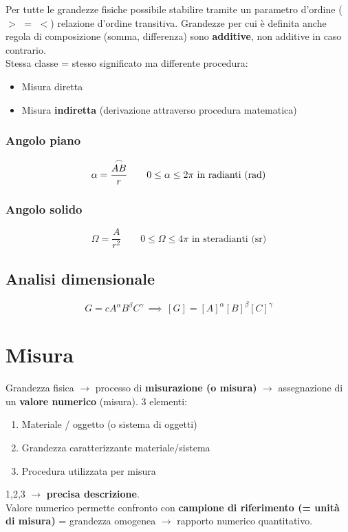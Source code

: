 \documentclass[10pt, oneside]{book}
\begin{document}
Per tutte le grandezze fisiche possibile stabilire tramite un parametro d'ordine ($>$ $=$ $<$) relazione d'ordine transitiva. Grandezze per cui è definita anche regola di composizione (somma, differenza) sono \textbf{additive}, non additive in caso contrario.\\
Stessa classe = stesso significato ma differente procedura:
\begin{itemize}
\item Misura diretta
\item Misura \textbf{indiretta} (derivazione attraverso procedura matematica)
\end{itemize}

\subsubsection*{Angolo piano}
\[\alpha = \frac{\overset{\large\frown}{AB}}{r} \qquad 0 \leq \alpha \leq 2 \pi \textrm{ in radianti (rad)}\]
\subsubsection*{Angolo solido}
\[\Omega = \frac{A}{r^2} \qquad 0 \leq \Omega \leq 4 \pi \textrm{ in steradianti (sr)}\]

\subsection{Analisi dimensionale}
\[G = c A^\alpha B^\beta C^\gamma \, \implies \, [G] = [A]^\alpha [B]^\beta [C]^\gamma\]

\section{Misura}
Grandezza fisica $\rightarrow$ processo di \textbf{misurazione (o misura)} $\rightarrow$ assegnazione di un \textbf{valore numerico} (misura). 3 elementi:
\begin{enumerate}
\item Materiale / oggetto (o sistema di oggetti)
\item Grandezza caratterizzante materiale/sistema
\item Procedura utilizzata per misura
\end{enumerate}
1,2,3 $\rightarrow$ \textbf{precisa descrizione}.\\
Valore numerico permette confronto con \textbf{campione di riferimento (= unità di misura)} = grandezza omogenea $\rightarrow$ rapporto numerico quantitativo.
\end{document}
